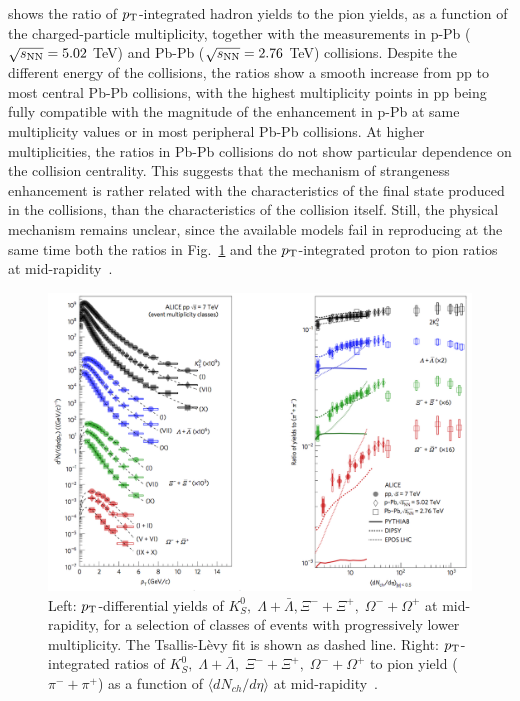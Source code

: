      shows the ratio of $p_{\rm T}$-integrated hadron yields to the pion yields, as a 
      function of the charged-particle multiplicity, together with the measurements
       in p-Pb ($\sqrt{s_{\rm NN}} = 5.02$ TeV) and Pb-Pb ($\sqrt{s_{\rm NN}} = 2.76$ TeV) collisions. 
       Despite the different energy of the collisions, the ratios show a smooth 
       increase from pp to most central Pb-Pb collisions, with the highest multiplicity 
       points in pp being fully compatible with the magnitude of the enhancement in 
       p-Pb at same multiplicity values or in most peripheral Pb-Pb collisions. At higher multiplicities,
       the ratios in Pb-Pb collisions do not show particular dependence on the collision centrality. This 
       suggests that the mechanism of strangeness enhancement is rather related
        with the characteristics of the final state produced in the collisions, than the
         characteristics of the collision itself. Still, the physical mechanism remains 
         unclear, since the available models fail in reproducing at the same time both
          the ratios in Fig.~\ref{fig:StrangenessALICEpp} and the $p_{\rm T}$-integrated 
          proton to pion ratios at mid-rapidity~\cite{ALICE:2017jyt}.
\begin{figure}[!ht]
  \centering
  \includegraphics[width=14cm]{FigCap1/StrangenessALICEpp.png}
  \caption{Left: $p_{\rm T}$-differential yields of $K^0_S,\; \Lambda + \bar{\Lambda}, \Xi^- + \Xi^+,\; \Omega^- + \Omega^+$ at mid-rapidity, for a selection of classes of events with progressively lower multiplicity. The Tsallis-Lèvy fit is shown as dashed line. Right: $p_{\rm T}$-integrated ratios of $K^0_S,\; \Lambda + \bar{\Lambda},\; \Xi^- + \Xi^+,\; \Omega^- + \Omega^+$ to pion yield ($\pi^- + \pi^+$) as a function of $\langle dN_{ch}/d\eta \rangle$ at mid-rapidity~\cite{ALICE:2017jyt}.}
  \label{fig:StrangenessALICEpp}
\end{figure}













